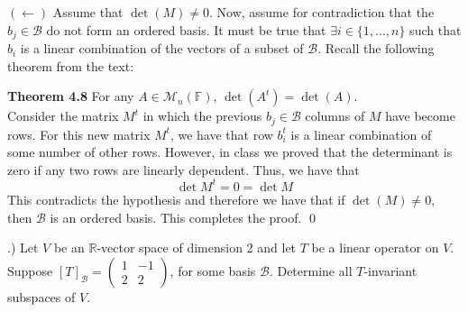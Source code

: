 \documentclass[a4paper, 11pt]{article}
\newcommand{\R}{\mathbb{R}}
\newcommand{\F}{\mathbb{F}}
\newenvironment{solution}{%
	\begin{list}{}{%
			\setlength{\topsep}{0pt}%
			\setlength{\leftmargin}{1.5cm}%
			\setlength{\rightmargin}{1.5cm}%
			\setlength{\listparindent}{\parindent}%
			\setlength{\itemindent}{\parindent}%
			\setlength{\parsep}{\parskip}%
		}%
		\item[]}{\end{list}}
\begin{document}
\begin{solution}
  \noindent$(\leftarrow)$ Assume that $\det(M)\neq 0$. Now, assume for contradiction that the $b_j\in\mathcal{B}$ do not form an ordered basis. It must be true that $\exists i\in\{1,...,n\}$ such that $b_i$ is a linear combination of the vectors of a subset of $\mathcal{B}$. Recall the following theorem from the text:

  \noindent \textbf{Theorem 4.8} For any $A\in\mathcal{M}_n(\F)$, $\det(A^t) = \det(A)$. \\

  \noindent Consider the matrix $M^t$ in which the previous $b_j\in\mathcal{B}$ columns of $M$ have become rows. For this new matrix $M^t$, we have that row $b_i^t$ is a linear combination of some number of other rows. However, in class we proved that the determinant is zero if any two rows are linearly dependent. Thus, we have that
  \begin{equation*}
      \det{M^t} = 0 = \det{M}
  \end{equation*}
  This contradicts the hypothesis and therefore we have that if $\det(M)\neq 0$, then $\mathcal{B}$ is an ordered basis.  This completes the proof. \qed \\ 
\end{solution}

.) Let $V$ be an $\R$-vector space of dimension 2 and let $T$ be a linear operator on $V$. Suppose $[T]_\mathcal{B} = \begin{pmatrix} 1 & -1 \\ 2 & 2 \end{pmatrix}$, for some basis $\mathcal{B}$. Determine all $T$-invariant subspaces of $V$.\\
\end{document}
